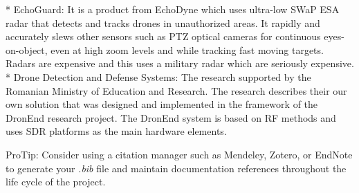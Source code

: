 * EchoGuard:  It is a product from EchoDyne which uses ultra-low SWaP ESA radar that detects and tracks drones in unauthorized areas. It rapidly and accurately slews other sensors such as PTZ optical cameras for continuous eyes-on-object, even at high zoom levels and while tracking fast moving targets. Radars are expensive and this uses a military radar which are seriously expensive.
 * Drone Detection and Defense Systems: The research supported by the Romanian Ministry of Education and Research. The research describes their our own solution that was designed and implemented in the framework of the DronEnd research project. The DronEnd system is based on RF methods and uses SDR platforms as the main hardware elements. \cite{https://www.ncbi.nlm.nih.gov/pmc/articles/PMC8879497/}



ProTip: Consider using a citation manager such as Mendeley, Zotero, or EndNote to generate your \textit{.bib} file and maintain documentation references throughout the life cycle of the project.

